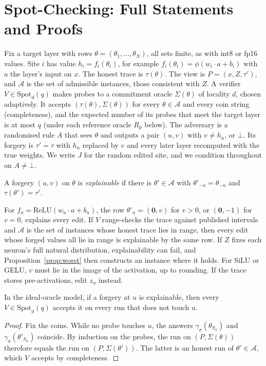 \section{Spot-Checking: Full Statements and Proofs}
\label{app:attack}

 Fix a target layer with rows $\theta=(\theta_1,\dots,\theta_N)$, all sets finite, as
with int8 or fp16 values. Site $i$ has value $h_i=f_i(\theta_i)$, for example
$f_i(\theta_i)=\phi(w_i\cdot a+b_i)$ with $a$ the layer's input on $x$. The honest trace is
$\tau(\theta)$. The view is $P=(x,Z,\tau')$, and $\mathcal A$ is the set of admissible instances,
those consistent with $Z$. A verifier $V\in\mathrm{Spot}_d(q)$ makes probes to a commitment oracle
$\Sigma(\theta)$ of locality $d$, chosen adaptively. It accepts $(\tau(\theta),\Sigma(\theta))$ for
every $\theta\in\mathcal A$ and every coin string (completeness), and the expected number of its
probes that meet the target layer is at most $q$ (under each reference oracle $R_p$ below). The
adversary is a randomised rule $A$ that sees $\theta$ and outputs a pair $(u,v)$ with $v\neq h_u$,
or $\bot$. Its forgery is $\tau'=\tau$ with $h_u$ replaced by $v$ and every later layer recomputed
with the true weights. We write $J$ for the random edited site, and we condition throughout on
$A\neq\bot$.

\begin{definition}
A forgery $(u,v)$ on $\theta$ is \emph{explainable} if there is $\theta'\in\mathcal A$ with
$\theta'_{-u}=\theta_{-u}$ and $\tau(\theta')=\tau'$.
\end{definition}

\noindent For $f_u=\mathrm{ReLU}(w_u\cdot a+b_u)$, the row $\theta'_u=(\mathbf 0,v)$ for $v>0$, or
$(\mathbf 0,-1)$ for $v=0$, explains every edit. If $V$ range-checks the trace against published
intervals and $\mathcal A$ is the set of instances whose honest trace lies in range, then every
edit whose forged values all lie in range is explainable by the same row. If $Z$ fixes each
neuron's full natural distribution, explainability can fail, and Proposition~\ref{prop:worst} then
constructs an instance where it holds. For SiLU or GELU, $v$ must lie in the image of the
activation, up to rounding. If the trace stores pre-activations, edit $z_u$ instead.

\begin{lemma}
\label{lem:notouch}
In the ideal-oracle model, if a forgery at $u$ is explainable, then every $V\in\mathrm{Spot}_d(q)$
accepts it on every run that does not touch $u$.
\end{lemma}
\begin{proof}
Fix the coins. While no probe touches $u$, the answers $\gamma_\sigma(\theta_{S_\sigma})$ and
$\gamma_\sigma(\theta'_{S_\sigma})$ coincide. By induction on the probes, the run on
$(P,\Sigma(\theta))$ therefore equals the run on $(P,\Sigma(\theta'))$. The latter is an honest run
of $\theta'\in\mathcal A$, which $V$ accepts by completeness.
\end{proof}

